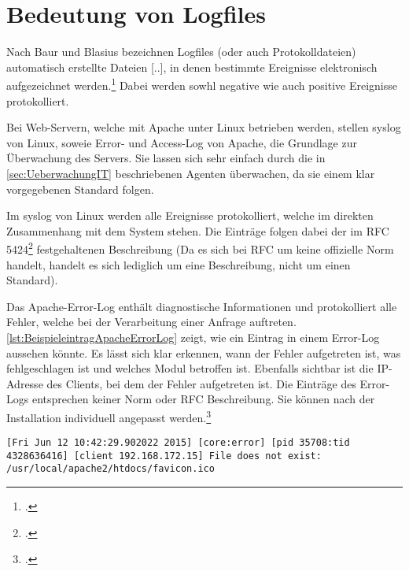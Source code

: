 
\section{Bedeutung von Logfiles}\label{sec:BedeutungVonLogfiles}
Nach Baur und Blasius bezeichnen Logfiles (oder auch Protokolldateien) \flqq [...] automatisch erstellte Dateien [..], in denen bestimmte Ereignisse elektronisch aufgezeichnet werden.\frqq\footcite[S. 847]{Baur.2014} Dabei werden sowhl negative wie auch positive Ereignisse protokolliert.

Bei Web-Servern, welche mit Apache unter Linux betrieben werden, stellen syslog von Linux, soweie Error- und Access-Log von Apache, die Grundlage zur Überwachung des Servers. Sie lassen sich sehr einfach durch die in \autoref{sec:UeberwachungIT} beschriebenen Agenten überwachen, da sie einem klar vorgegebenen Standard folgen.

Im syslog von Linux werden alle Ereignisse protokolliert, welche im direkten Zusammenhang mit dem System stehen. Die Einträge folgen dabei der im \ac{RFC} 5424\footcite[RFC 5424,][]{RFC5424.2009} festgehaltenen Beschreibung (Da es sich bei RFC um keine offizielle Norm handelt, handelt es sich lediglich um eine Beschreibung, nicht um einen Standard).

Das Apache-Error-Log enthält diagnostische Informationen und protokolliert alle Fehler, welche bei der Verarbeitung einer Anfrage auftreten. \autoref{lst:BeispieleintragApacheErrorLog} zeigt, wie ein Eintrag in einem Error-Log aussehen könnte. Es lässt sich klar erkennen, wann der Fehler aufgetreten ist, was fehlgeschlagen ist und welches Modul betroffen ist. Ebenfalls sichtbar ist die \ac{IP}-Adresse des Clients, bei dem der Fehler aufgetreten ist. Die Einträge des Error-Logs entsprechen keiner Norm oder \ac{RFC} Beschreibung. Sie können nach der Installation individuell angepasst werden.\footcite[Vgl.][]{ApacheErrorLog.2015} \\

\begin{lstlisting}[caption=Beispieleintrag für ein Appache-Error-Log,label=lst:BeispieleintragApacheErrorLog]
[Fri Jun 12 10:42:29.902022 2015] [core:error] [pid 35708:tid 4328636416] [client 192.168.172.15] File does not exist: /usr/local/apache2/htdocs/favicon.ico
\end{lstlisting}

